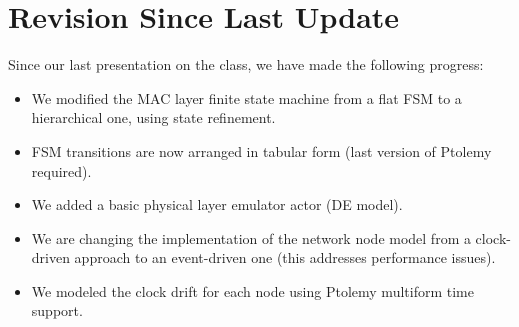 \section{Revision Since Last Update}
\label{sec:revision-since-last}

Since our last presentation on the class, we have made the following progress:

\begin{itemize}
\item We modified the MAC layer finite state machine from a flat FSM to a hierarchical one, using state refinement.
\item FSM transitions are now arranged in tabular form (last version of Ptolemy required).
\item We added a basic physical layer emulator actor (DE model).
\item We are changing the implementation of the network node model from a clock-driven approach to an event-driven one (this addresses performance issues).
\item We modeled the clock drift for each node using Ptolemy multiform time support.
\end{itemize}


